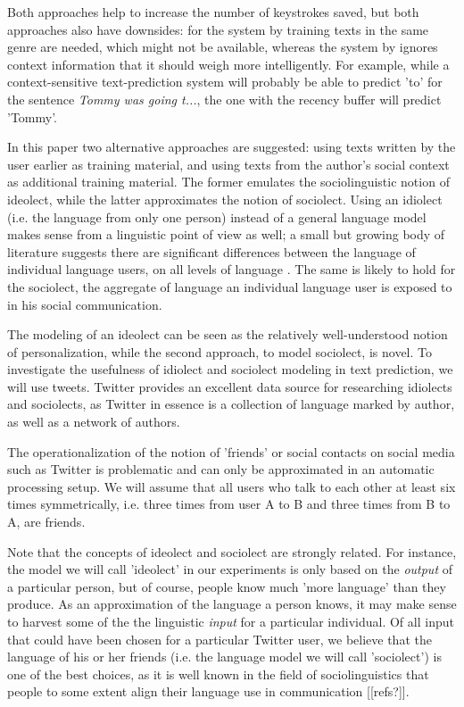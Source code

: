 \documentclass[11pt]{article}
\begin{document}
Both approaches help to increase the number of keystrokes saved, but both approaches also have downsides: for the system by  training texts in the same genre are needed, which might not be available, whereas the system by  ignores context information that it should weigh more intelligently. For example, while a context-sensitive text-prediction system will probably be able to predict 'to' for the sentence \emph{Tommy was going t...}, the one with the recency buffer will predict 'Tommy'.

In this paper two alternative approaches are suggested: using texts written by the user earlier as training material, and using texts from the author's social context as additional training material. The former emulates the sociolinguistic notion of ideolect, while the latter approximates the notion of sociolect. Using an idiolect (i.e. the language from only one person) instead of a general language model makes sense from a linguistic point of view as well; a small but growing body of literature suggests there are significant differences between the language of individual language users, on all levels of language \cite[among others]{mollin09,barlow10}. The same is likely to hold for the sociolect, the aggregate of language an individual language user is exposed to in his social communication.

The modeling of an ideolect can be seen as the relatively well-understood notion of personalization, while the second approach, to model sociolect, is novel. To investigate the usefulness of idiolect and sociolect modeling in text prediction, we will use tweets. Twitter provides an excellent data source for researching idiolects and sociolects, as Twitter in essence is a collection of language marked by author, as well as a network of authors. 

The operationalization of the notion of 'friends' or social contacts on social media such as Twitter is problematic and can only be approximated in an automatic processing setup. We will assume that all users who talk to each other at least six times symmetrically, i.e. three times from user A to B and three times from B to A, are friends. 

Note that the concepts of ideolect and sociolect are strongly related. For instance, the model we will call 'ideolect' in our experiments is only based on the \emph{output} of a particular person, but of course, people know much 'more language' than they produce. As an approximation of the language a person knows, it may make sense to harvest some of the the linguistic \emph{input} for a particular individual. Of all input that could have been chosen for a particular Twitter user, we believe that the language of his or her friends (i.e. the language model we will call 'sociolect') is one of the best choices, as it is well known in the field of sociolinguistics that people to some extent align their language use in communication [[refs?]]. 
\end{document}
